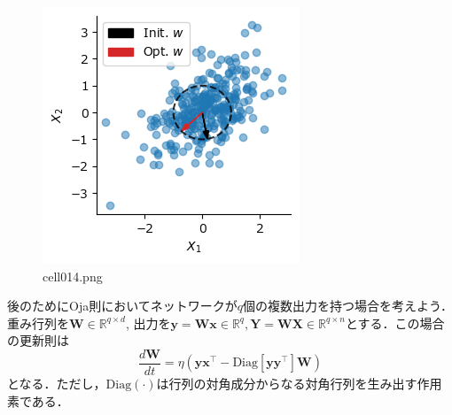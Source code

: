 \begin{figure}[ht]
	\centering
	\includegraphics[scale=0.8, max width=\linewidth]{./fig/local-learning-rule/pca-hebbian-learning/cell014.png}
	\caption{cell014.png}
	\label{cell014.png}
\end{figure}
後のためにOja則においてネットワークが$q$個の複数出力を持つ場合を考えよう．重み行列を$\mathbf{W} \in \mathbb{R}^{q\times d}$, 出力を$\mathbf{y}=\mathbf{W}\mathbf{x} \in \mathbb{R}^{q}, \mathbf{Y}=\mathbf{W}\mathbf{X} \in \mathbb{R}^{q\times n}$とする．この場合の更新則は
\begin{equation}
\frac{d\mathbf{W}}{dt} = \eta \left(\mathbf{y}\mathbf{x}^\top - \mathrm{Diag}\left[\mathbf{y}\mathbf{y}^\top\right] \mathbf{W}\right)
\end{equation}
となる．ただし，$\mathrm{Diag}(\cdot)$は行列の対角成分からなる対角行列を生み出す作用素である．
